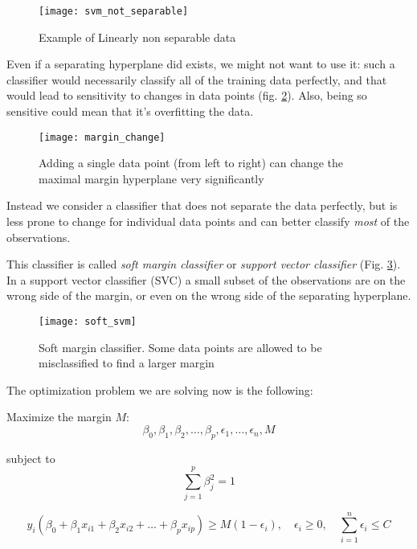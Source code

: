 \begin{figure}[H]
	\centering
	\texttt{[image: svm\_not\_separable]}
	\caption{Example of Linearly non separable data \cite{svm_not_sep}}
	\label{fig:svmnotsep}
\end{figure}

Even if a separating hyperplane did exists, we might not want to use it: such a classifier would necessarily  classify all of the training data perfectly, and that would lead to sensitivity to changes in data points (fig. \ref{fig:margin_change}). Also, being so sensitive could mean that it's overfitting the data. 

\begin{figure}[H]
	\centering
	\texttt{[image: margin\_change]}
	\caption{Adding a single data point (from left to right) can change the maximal margin hyperplane very significantly \cite{ISLR}}
	\label{fig:margin_change}
\end{figure}

Instead we consider a classifier that does not separate the data perfectly, but is less prone to change for individual data points and can better classify \textit{most} of the observations.

This classifier is called \textit{soft margin classifier} or \textit{support vector classifier} (Fig. \ref{fig:soft_svm}). \\
In a support vector classifier (SVC) a small subset of the observations are on the wrong side of the margin, or even on the wrong side of the separating hyperplane.

\begin{figure}[H]
	\centering
	\texttt{[image: soft\_svm]}
	\caption{Soft margin classifier. Some data points are allowed to be misclassified to find a larger margin \cite{soft_svm}}
	\label{fig:soft_svm}
\end{figure}

The optimization problem we are solving now is the following: 

Maximize the margin $M$:
\begin{equation} \label{eq:svm4}
\beta_0, \beta_1, \beta_2, \dots, \beta_p, \epsilon_1, \dots, \epsilon_n, M
\end{equation}

subject to
\begin{equation} \label{eq:svm5}
\sum_{j=1}^{p}\beta^2_j = 1
\end{equation}

\begin{equation} \label{eq:svm6}
y_i(\beta_0 + \beta_1 x_{i1} + \beta_2 x_{i2} + \dots + \beta_p x_{ip}) \ge M(1 - \epsilon_i), \quad \epsilon_i \ge 0, \quad \sum_{i=1}^{n}\epsilon_i \le C
\end{equation}


